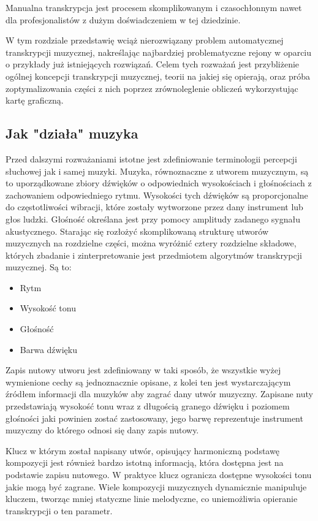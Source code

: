 \documentclass[12pt,a4paper,twoside]{mwart}
\begin{document}
Manualna transkrypcja jest procesem skomplikowanym i czasochłonnym nawet dla profesjonalistów z dużym doświadczeniem w tej dziedzinie.

W tym rozdziale przedstawię wciąż nierozwiązany problem automatycznej transkrypcji muzycznej, nakreślając najbardziej problematyczne rejony w oparciu o przykłady już istniejących rozwiązań.  Celem tych rozważań jest przybliżenie ogólnej koncepcji transkrypcji muzycznej, teorii na jakiej się opierają, oraz próba zoptymalizowania części z nich poprzez zrównoleglenie obliczeń wykorzystując kartę graficzną.

\subsection{Jak "działa" muzyka}
Przed dalszymi rozważaniami istotne jest zdefiniowanie terminologii percepcji słuchowej jak i samej muzyki. Muzyka, równoznaczne z utworem muzycznym, są to uporządkowane zbiory dźwięków o odpowiednich wysokościach i głośnościach z zachowaniem odpowiedniego rytmu. Wysokości tych dźwięków są proporcjonalne do częstotliwości wibracji, które zostały wytworzone przez dany instrument lub głos ludzki. Głośność określana jest przy pomocy amplitudy zadanego sygnału akustycznego. Starając się rozłożyć skomplikowaną strukturę utworów muzycznych na rozdzielne części, można wyróżnić cztery rozdzielne składowe, których zbadanie i zinterpretowanie jest przedmiotem algorytmów transkrypcji muzycznej. Są to:
\begin{itemize}
\item Rytm
\item Wysokość tonu
\item Głośność
\item Barwa dźwięku
\end{itemize}
Zapis nutowy utworu jest zdefiniowany w taki sposób, że wszystkie wyżej wymienione cechy są jednoznacznie opisane, z kolei ten jest wystarczającym źródłem informacji dla muzyków aby zagrać dany utwór muzyczny. Zapisane nuty przedstawiają wysokość tonu wraz z długością granego dźwięku i poziomem głośności jaki powinien zostać zastosowany, jego barwę reprezentuje instrument muzyczny do którego odnosi się dany zapis nutowy. 

Klucz w którym został napisany utwór, opisujący harmoniczną podstawę kompozycji jest również bardzo istotną informacją, która dostępna jest na podstawie zapisu nutowego. W praktyce klucz ogranicza dostępne wysokości tonu jakie mogą być zagrane. Wiele kompozycji muzycznych dynamicznie manipuluje kluczem, tworząc mniej statyczne linie melodyczne, co uniemożliwia opieranie transkrypcji o ten parametr.
\end{document}
